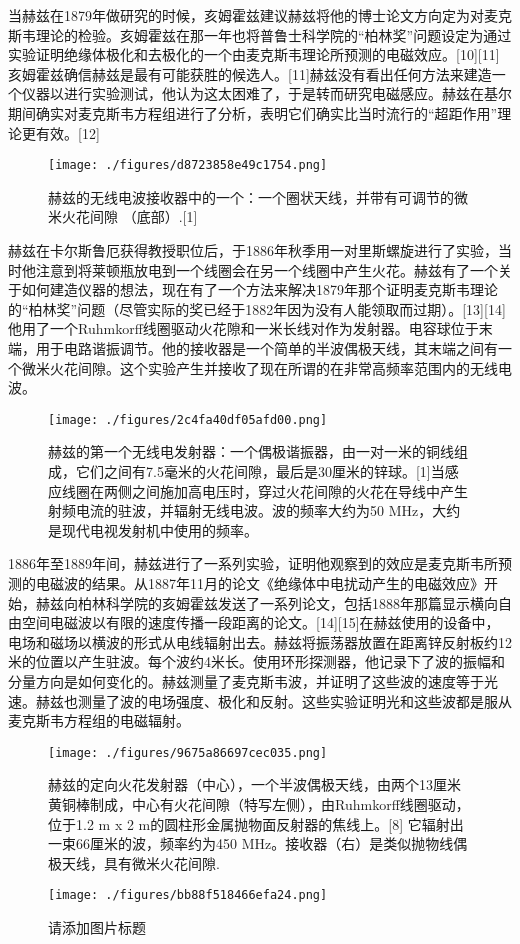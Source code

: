 当赫兹在1879年做研究的时候，亥姆霍兹建议赫兹将他的博士论文方向定为对麦克斯韦理论的检验。亥姆霍兹在那一年也将普鲁士科学院的“柏林奖”问题设定为通过实验证明绝缘体极化和去极化的一个由麦克斯韦理论所预测的电磁效应。[10][11]亥姆霍兹确信赫兹是最有可能获胜的候选人。[11]赫兹没有看出任何方法来建造一个仪器以进行实验测试，他认为这太困难了，于是转而研究电磁感应。赫兹在基尔期间确实对麦克斯韦方程组进行了分析，表明它们确实比当时流行的“超距作用”理论更有效。[12]
\begin{figure}[ht]
\centering
\texttt{[image: ./figures/d8723858e49c1754.png]}
\caption{赫兹的无线电波接收器中的一个：一个圈状天线，并带有可调节的微米火花间隙 （底部）.[1]} \label{fig_Hertz_2}
\end{figure}
赫兹在卡尔斯鲁厄获得教授职位后，于1886年秋季用一对里斯螺旋进行了实验，当时他注意到将莱顿瓶放电到一个线圈会在另一个线圈中产生火花。赫兹有了一个关于如何建造仪器的想法，现在有了一个方法来解决1879年那个证明麦克斯韦理论的“柏林奖”问题（尽管实际的奖已经于1882年因为没有人能领取而过期）。[13][14]他用了一个Ruhmkorff线圈驱动火花隙和一米长线对作为发射器。电容球位于末端，用于电路谐振调节。他的接收器是一个简单的半波偶极天线，其末端之间有一个微米火花间隙。这个实验产生并接收了现在所谓的在非常高频率范围内的无线电波。
\begin{figure}[ht]
\centering
\texttt{[image: ./figures/2c4fa40df05afd00.png]}
\caption{赫兹的第一个无线电发射器：一个偶极谐振器，由一对一米的铜线组成，它们之间有7.5毫米的火花间隙，最后是30厘米的锌球。[1]当感应线圈在两侧之间施加高电压时，穿过火花间隙的火花在导线中产生射频电流的驻波，并辐射无线电波。波的频率大约为50 MHz，大约是现代电视发射机中使用的频率。} \label{fig_Hertz_3}
\end{figure}
1886年至1889年间，赫兹进行了一系列实验，证明他观察到的效应是麦克斯韦所预测的电磁波的结果。从1887年11月的论文《绝缘体中电扰动产生的电磁效应》开始，赫兹向柏林科学院的亥姆霍兹发送了一系列论文，包括1888年那篇显示横向自由空间电磁波以有限的速度传播一段距离的论文。[14][15]在赫兹使用的设备中，电场和磁场以横波的形式从电线辐射出去。赫兹将振荡器放置在距离锌反射板约12米的位置以产生驻波。每个波约4米长。使用环形探测器，他记录下了波的振幅和分量方向是如何变化的。赫兹测量了麦克斯韦波，并证明了这些波的速度等于光速。赫兹也测量了波的电场强度、极化和反射。这些实验证明光和这些波都是服从麦克斯韦方程组的电磁辐射。
\begin{figure}[ht]
\centering
\texttt{[image: ./figures/9675a86697cec035.png]}
\caption{赫兹的定向火花发射器（中心），一个半波偶极天线，由两个13厘米黄铜棒制成，中心有火花间隙（特写左侧），由Ruhmkorff线圈驱动，位于1.2 m x 2 m的圆柱形金属抛物面反射器的焦线上。[8] 它辐射出一束66厘米的波，频率约为450 MHz。接收器（右）是类似抛物线偶极天线，具有微米火花间隙.} \label{fig_Hertz_4}
\end{figure}
\begin{figure}[ht]
\centering
\texttt{[image: ./figures/bb88f518466efa24.png]}
\caption{请添加图片标题} \label{fig_Hertz_5}
\end{figure}
